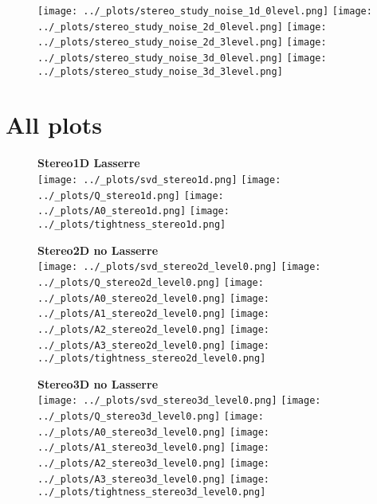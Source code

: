 \documentclass[11pt]{article}
\begin{document}
\begin{figure}[h]
  \centering
  \texttt{[image: ../\_plots/stereo\_study\_noise\_1d\_0level.png]}
  \texttt{[image: ../\_plots/stereo\_study\_noise\_2d\_0level.png]}
  \texttt{[image: ../\_plots/stereo\_study\_noise\_2d\_3level.png]}
  \texttt{[image: ../\_plots/stereo\_study\_noise\_3d\_0level.png]}
  \texttt{[image: ../\_plots/stereo\_study\_noise\_3d\_3level.png]}
  \label{fig:noise}
\end{figure}

\clearpage
\FloatBarrier
\section{All plots}

\begin{figure}[h!]
  \centering
  \textbf{\large{Stereo1D Lasserre}} \\
  \vspace{2em}
  \texttt{[image: ../\_plots/svd\_stereo1d.png]}
  \texttt{[image: ../\_plots/Q\_stereo1d.png]}
  \texttt{[image: ../\_plots/A0\_stereo1d.png]}
  \texttt{[image: ../\_plots/tightness\_stereo1d.png]}
  \label{fig:noise}
\end{figure}


\begin{figure}[h!]
  \centering
  \textbf{\large{Stereo2D no Lasserre}} \\
  \vspace{2em}
  \texttt{[image: ../\_plots/svd\_stereo2d\_level0.png]}
  \texttt{[image: ../\_plots/Q\_stereo2d\_level0.png]}
  \texttt{[image: ../\_plots/A0\_stereo2d\_level0.png]}
  \texttt{[image: ../\_plots/A1\_stereo2d\_level0.png]}
  \texttt{[image: ../\_plots/A2\_stereo2d\_level0.png]}
  \texttt{[image: ../\_plots/A3\_stereo2d\_level0.png]}
  \texttt{[image: ../\_plots/tightness\_stereo2d\_level0.png]}

  \label{fig:noise}
\end{figure}

\begin{figure}[h]
  \centering
  \textbf{\large{Stereo3D no Lasserre}} \\
  \vspace{2em}
  \texttt{[image: ../\_plots/svd\_stereo3d\_level0.png]}
  \texttt{[image: ../\_plots/Q\_stereo3d\_level0.png]}
  \texttt{[image: ../\_plots/A0\_stereo3d\_level0.png]}
  \texttt{[image: ../\_plots/A1\_stereo3d\_level0.png]}
  \texttt{[image: ../\_plots/A2\_stereo3d\_level0.png]}
  \texttt{[image: ../\_plots/A3\_stereo3d\_level0.png]}
  \texttt{[image: ../\_plots/tightness\_stereo3d\_level0.png]}
  \label{fig:noise}
\end{figure}
\end{document}
